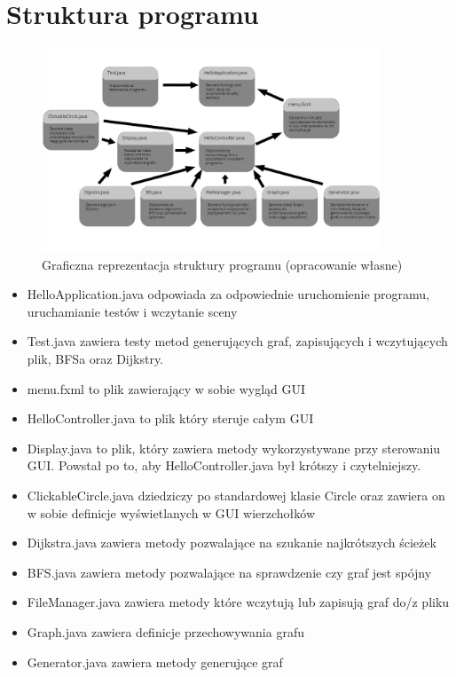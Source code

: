 \documentclass{article}
\begin{document}
\section{Struktura programu}
\begin{figure}[htp]
\centering
\includegraphics[width=0.9\textwidth]{Screenshot_590.jpg}
\caption{\label{fig:mod}Graficzna reprezentacja struktury programu (opracowanie własne)}
\end{figure}
\begin{itemize}
    \item \texttt\footnotesize{HelloApplication.java} odpowiada za odpowiednie uruchomienie programu, uruchamianie testów i wczytanie sceny
    \item \texttt\footnotesize{Test.java} zawiera testy metod generujących graf, zapisujących i wczytujących plik, BFSa oraz Dijkstry.
    \item \texttt\footnotesize{menu.fxml} to plik zawierający w sobie wygląd GUI
    \item \texttt\footnotesize{HelloController.java} to plik który steruje całym GUI
    \item \texttt\footnotesize{Display.java} to plik, który zawiera metody wykorzystywane przy sterowaniu GUI. Powstał po to, aby \texttt\footnotesize{HelloController.java} był krótszy i czytelniejszy.
    \item \texttt\footnotesize {ClickableCircle.java} dziedziczy po standardowej klasie \texttt\footnotesize{Circle} oraz zawiera on w sobie definicje wyświetlanych w GUI wierzchołków
    \item \texttt\footnotesize{Dijkstra.java} zawiera metody pozwalające na szukanie najkrótszych ścieżek
    \item \texttt\footnotesize{BFS.java} zawiera metody pozwalające na sprawdzenie czy graf jest spójny
    \item \texttt\footnotesize{FileManager.java} zawiera metody które wczytują lub zapisują graf do/z pliku
    \item \texttt\footnotesize{Graph.java} zawiera definicje przechowywania grafu
    \item \texttt\footnotesize{Generator.java} zawiera metody generujące graf
    
\end{itemize}
\end{document}
